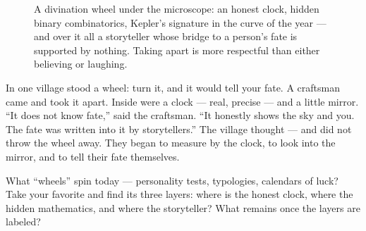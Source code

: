 \documentclass[11pt,letterpaper]{article}
\begin{document}
\begin{figure}[H]
\centering
{}
\caption{A divination wheel under the microscope: an honest clock,
hidden binary combinatorics, Kepler's signature in the curve of the
year --- and over it all a storyteller whose bridge to a person's
fate is supported by nothing. Taking apart is more respectful than
either believing or laughing.}
\label{fig:wheel}
\end{figure}

\begin{talebox}
In one village stood a wheel: turn it, and it would tell your fate.
A craftsman came and took it apart. Inside were a clock --- real,
precise --- and a little mirror. ``It does not know fate,'' said the
craftsman. ``It honestly shows the sky and you. The fate was written
into it by storytellers.'' The village thought --- and did not throw
the wheel away. They began to measure by the clock, to look into the
mirror, and to tell their fate themselves.
\end{talebox}

\begin{askbox}
What ``wheels'' spin today --- personality tests, typologies,
calendars of luck? Take your favorite and find its three layers:
where is the honest clock, where the hidden mathematics, and where
the storyteller? What remains once the layers are labeled?
\end{askbox}
\end{document}
